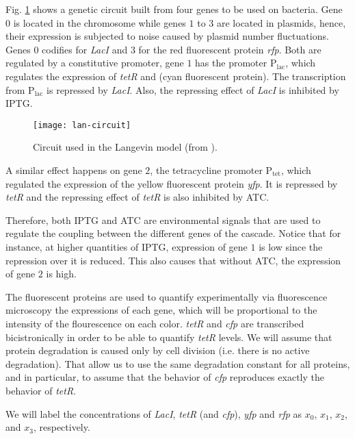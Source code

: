 
Fig. \ref{fig:lan-circuit} shows a genetic circuit built from four genes to be used on bacteria. Gene $0$ is located in the chromosome while genes $1$ to $3$ are located in plasmids, hence, their expression is subjected to noise caused by plasmid number fluctuations. Genes $0$ codifies for \textit{LacI} and $3$ for the red fluorescent protein \textit{rfp}. Both are regulated by a constitutive promoter, gene $1$ has the promoter P$_\text{lac}$, which regulates the expression of \textit{tetR} and  (cyan fluorescent protein). The transcription from P$_\text{lac}$ is repressed by \textit{LacI}. Also, the repressing effect of \textit{LacI} is inhibited by IPTG.

\begin{figure}[H]
  \centering
  \texttt{[image: lan-circuit]}
  \caption[Circuit used for the Langevin model]{\label{fig:lan-circuit} Circuit used in the Langevin model (from \cite{pedraza05}).}
\end{figure}

A similar effect happens on gene $2$, the tetracycline promoter P$_\text{tet}$, which regulated the expression of the yellow fluorescent protein \textit{yfp}. It is repressed by \textit{tetR} and the repressing effect of \textit{tetR} is also inhibited by ATC.

Therefore, both IPTG and ATC are environmental signals that are used to regulate the coupling between the different genes of the cascade. Notice that for instance, at higher quantities of IPTG, expression of gene $1$ is low since the repression over it is reduced. This also causes that without ATC, the expression of gene $2$ is high. 

The fluorescent proteins are used to quantify experimentally via fluorescence microscopy the expressions of each gene, which will be proportional to the intensity of the flourescence on each color. \textit{tetR} and \textit{cfp} are transcribed bicistronically in order to be able to quantify \textit{tetR} levels. We will assume that protein degradation is caused only by cell division (i.e. there is no active degradation). That allow us to use the same degradation constant for all proteins, and in particular, to assume that the behavior of \textit{cfp} reproduces exactly the behavior of \textit{tetR}. 

We will label the concentrations of \textit{LacI}, \textit{tetR} (and \textit{cfp}), \textit{yfp} and \textit{rfp} as $x_0$, $x_1$, $x_2$, and $x_3$, respectively.

